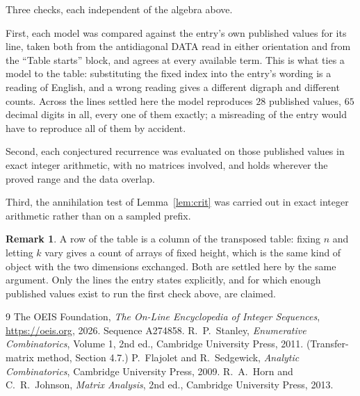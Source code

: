 \documentclass[11pt,a4paper]{article}
\theoremstyle{plain}
\theoremstyle{definition}
\newtheorem{remark}[theorem]{Remark}
\begin{document}
Three checks, each independent of the algebra above.

First, each model was compared against the entry's own published values for its line, taken
both from the antidiagonal DATA read in either orientation and from the ``Table starts''
block, and agrees at every available term. This is what ties a model to the table:
substituting the fixed index into the entry's wording is a reading of English, and a wrong
reading gives a different digraph and different counts. Across the lines settled here the
model reproduces $28$ published values, $65$ decimal digits in all, every one of
them exactly; a misreading of the entry would have to reproduce all of them by accident.

Second, each conjectured recurrence was evaluated on those published values in exact
integer arithmetic, with no matrices involved, and holds wherever the proved range and the
data overlap.

Third, the annihilation test of Lemma~\ref{lem:crit} was carried out in exact integer
arithmetic rather than on a sampled prefix.

\begin{remark}
A row of the table is a column of the transposed table: fixing $n$ and letting $k$ vary gives a
count of arrays of fixed height, which is the same kind of object with the two dimensions
exchanged. Both are settled here by the same argument. Only the lines the entry states
explicitly, and for which enough published values exist to run the first check above, are
claimed.
\end{remark}

\begin{thebibliography}{9}
 The OEIS Foundation, \emph{The On-Line Encyclopedia of Integer
Sequences}, \url{https://oeis.org}, 2026. Sequence A274858.
 R.~P.~Stanley, \emph{Enumerative Combinatorics}, Volume 1, 2nd ed.,
Cambridge University Press, 2011. (Transfer-matrix method, Section 4.7.)
 P.~Flajolet and R.~Sedgewick, \emph{Analytic Combinatorics}, Cambridge
University Press, 2009.
 R.~A.~Horn and C.~R.~Johnson, \emph{Matrix Analysis}, 2nd ed., Cambridge
University Press, 2013.
\end{thebibliography}
\end{document}

